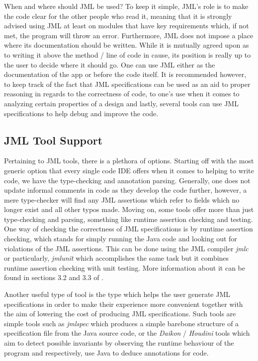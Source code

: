 \documentclass{article}
\begin{document}
When and where should JML be used? To keep it simple, JML's role is to make the code clear for the other people who read it, meaning that it is strongly advised using JML at least on modules that have key requirements which, if not met, the program will throw an error. Furthermore, JML does not impose a place where its documentation should be written. \cite{leavens2008jml} While it is mutually agreed upon as to writing it above the method / line of code in cause, its position is really up to the user to decide where it should go. One can use JML either as the documentation of the app or before the code itself. It is recommended however, to keep track of the fact that JML specifications can be used as an aid to proper reasoning in regards to the correctness of code, to one's use when it comes to analyzing certain properties of a design and lastly, several tools can use JML specifications to help debug and improve the code.

\subsection{JML Tool Support}
Pertaining to JML tools, there is a plethora of options. Starting off with the most generic option that every single code IDE offers when it comes to helping to write code, we have the type-checking and annotation parsing. Generally, one does not update informal comments in code as they develop the code further, however, a mere type-checker will find any JML assertions which refer to fields which no longer exist and all other typos made. Moving on, some tools offer more than just type-checking and parsing, something like runtime assertion checking and testing. \cite{burdy2005overview} One way of checking the correctness of JML specifications is by runtime assertion checking, which stands for simply running the Java code and looking out for violations of the JML assertions. This can be done using the JML compiler \textit{jmlc} or particularly, \textit{jmlunit} which accomplishes the same task but it combines runtime assertion checking with unit testing. More information about it can be found in sections 3.2 and 3.3 of \cite{burdy2005overview}.

Another useful type of tool is the type which helps the user generate JML specifications in order to make their experience more convenient together with the aim of lowering the cost of producing JML specifications. Such tools are simple tools such as \textit{jmlspec} which produces a simple barebone structure of a specification file from the Java source code, or the \textit{Daikon} / \textit{Houdini} tools which aim to detect possible invariants by observing the runtime behaviour of the program and respectively, use Java to deduce annotations for code.
\end{document}
